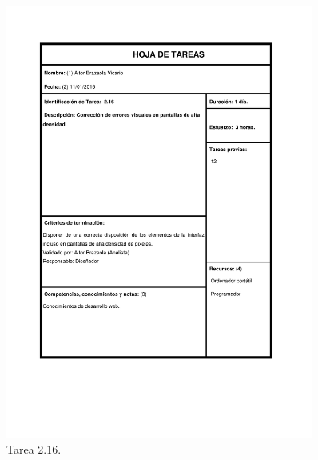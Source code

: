 \documentclass{DeustoFDP}
\begin{document}
\begin{figure}[H]
	\centering
	\includegraphics[width=0.9\textwidth]{fig/Tareas/216}
	\caption{Tarea 2.16.}
	\label{fig:t216}
\end{figure}
\end{document}
